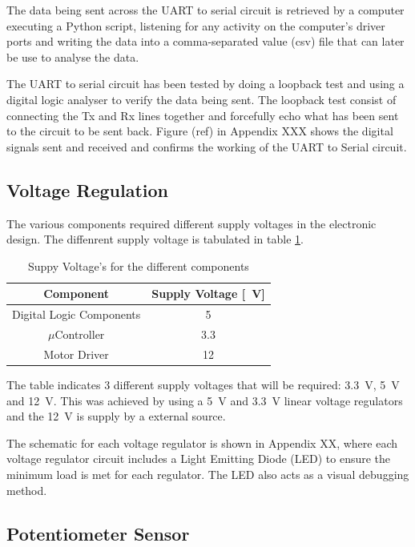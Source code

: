 The data being sent across the UART to serial circuit is retrieved by a computer executing a Python script, listening for any activity on the computer's driver ports and writing the data into a comma-separated value (csv) file that can later be use to analyse the data.


The UART to serial circuit has been tested by doing a loopback test and using a digital logic analyser to verify the data being sent. The loopback test consist of connecting the Tx and Rx lines together and forcefully echo what has been sent to the circuit to be sent back. Figure (ref) in Appendix XXX shows the digital signals sent and received and confirms the working of the UART to Serial circuit. 

\subsection{Voltage Regulation}

The various components required different supply voltages in the electronic design. The diffenrent supply voltage is tabulated in table \ref{table:supplyVoltage}.

\begin{table}[]
	\centering
	\begin{tabular}{|c|c|}
		\hline
		Component & Supply Voltage [\SI{}{V}] \\
		\hline
		\hline
		Digital Logic Components & \SI{5}{} \\
		\hline
		$\mu$Controller & \SI{3.3}{} \\
		\hline
		Motor Driver & \SI{12}{} \\
		\hline
	\end{tabular}
	\caption{Suppy Voltage's for the different components}
	\label{table:supplyVoltage}
\end{table}


The table indicates 3 different supply voltages that will be required: \SI{3.3}{V}, \SI{5}{V} and \SI{12}{V}. This was achieved by using a \SI{5}{V} and \SI{3.3}{V} linear voltage regulators and the \SI{12}{V} is supply by a external source.

The schematic for each voltage regulator is shown in Appendix XX, where each voltage regulator circuit includes a Light Emitting Diode (LED) to ensure the minimum load is met for each regulator. The LED also acts as a visual debugging method.

\subsection{Potentiometer Sensor}
